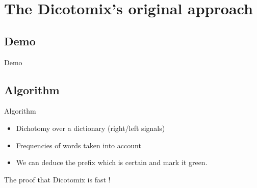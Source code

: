 \documentclass[graphics]{beamer}
\begin{document}
\section{The Dicotomix's original approach}

\subsection{Demo}
\begin{frame}{Demo}
	\begin{center}
	\end{center}
\end{frame}

\subsection{Algorithm}
\begin{frame}{Algorithm}
	\begin{center}
		\begin{itemize}
			\item Dichotomy over a dictionary (right/left signals)
			\item Frequencies of words taken into account
			\item We can deduce the prefix which is certain and mark it green.
		\end{itemize}
	\end{center}
\end{frame}

\begin{frame}{The proof that Dicotomix is fast !}
\end{frame}
\end{document}
